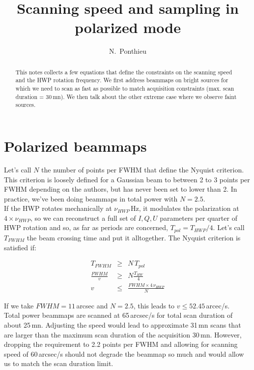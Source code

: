 \documentclass[a4paper,10pt]{article}
\title{Scanning speed and sampling in polarized mode}
\author{N.~Ponthieu}
\begin{document}
\maketitle
\tableofcontents

\begin{abstract}
This notes collects a few equations that define the constraints on the scanning
speed and the HWP rotation frequency. We first address beammaps on bright
sources for which we need to scan as fast as possible to match acquisition
constraints (max. scan duration = 30\,mn). We then talk about the other extreme
case where we observe faint sources.
\end{abstract}

\section{Polarized beammaps}

Let's call $N$ the number of points per FWHM that define the Nyquist
criterion. This criterion is loosely defined for a Gaussian beam to between 2 to
3 points per FWHM depending on the authors, but has never been set to lower than
2. In practice, we've been doing beammaps in total power with $N=2.5$.\\

If the HWP rotates mechanically at $\nu_{HWP}$\,Hz, it modulates the polarization
at $4\times\nu_{HWP}$, so we can reconstruct a full set of $I,Q,U$ parameters
per quarter of HWP rotation and so, as far as periods are concerned, $T_{pol} =
T_{HWP}/4$. Let's call $T_{FWHM}$ the beam crossing time and put it
alltogether. The Nyquist criterion is satisfied if:

\begin{eqnarray}
T_{FWHM} &\geq& N\,T_{pol} \\
\frac{FWHM}{v} &\geq &N\frac{T_{HW}}{4}\\
v  &\leq & \frac{FWHM\times 4\,\nu_{HWP}}{N}
\end{eqnarray}

If we take $FWHM=11$\,arcsec and $N=2.5$, this leads to $v \leq
52.45$\,arcec/s.\\

Total power beammaps are scanned at 65\,arcsec/s for total scan duration of
about 25\,mn. Adjusting the speed would lead to approximate 31\,mn scans that
are larger than the maximum scan duration of the acquisition 30\,mn. However,
dropping the requirement to 2.2 points per FWHM and allowing for scanning speed
of 60\,arcsec/s should not degrade the beammap so much and would allow us to
match the scan duration limit.
\end{document}
